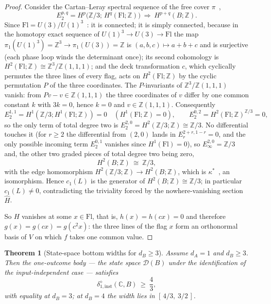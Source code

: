 \documentclass[11pt,a4paper]{article}
\newtheorem{theorem}{Theorem}[section]
\begin{document}
\begin{proof}
Consider the Cartan--Leray spectral sequence of the free cover
$\pi$~\cite{Brown1982},
\[
E_2^{p,q}=H^p\bigl(\mathbb Z/3;\,H^q(\mathrm{Fl};\mathbb Z)\bigr)
\ \Longrightarrow\ H^{p+q}(B;\mathbb Z).
\]
Since $\mathrm{Fl}=U(3)/U(1)^3$~\cite{Fulton1997}: it is connected; it is simply
connected, because in the homotopy exact sequence of
$U(1)^3\to U(3)\to\mathrm{Fl}$ the map
$\pi_1(U(1)^3)=\mathbb Z^3\to\pi_1(U(3))=\mathbb Z$ is
$(a,b,c)\mapsto a+b+c$ and is surjective (each phase loop winds the determinant
once); its second cohomology is
$H^2(\mathrm{Fl};\mathbb Z)\cong\mathbb Z^3/\mathbb Z(1,1,1)$; and the deck
transformation $c$, which cyclically permutes the three lines of every flag,
acts on $H^2(\mathrm{Fl};\mathbb Z)$ by the cyclic permutation $P$ of the three
coordinates. The $P$-invariants of $\mathbb Z^3/\mathbb Z(1,1,1)$ vanish: from
$Pv-v\in\mathbb Z(1,1,1)$ the three coordinates of $v$ differ by one common
constant $k$ with $3k=0$, hence $k=0$ and $v\in\mathbb Z(1,1,1)$. Consequently
\[
E_2^{1,1}=H^1(\mathbb Z/3;H^1(\mathrm{Fl};\mathbb Z))=0
\quad(H^1(\mathrm{Fl};\mathbb Z)=0),
\qquad
E_2^{0,2}=H^2(\mathrm{Fl};\mathbb Z)^{\mathbb Z/3}=0,
\]
so the only term of total degree two is
$E_2^{2,0}=H^2(\mathbb Z/3;\mathbb Z)\cong\mathbb Z/3$. No differential touches
it (for $r\ge2$ the differential from $(2,0)$ lands in $E_r^{2+r,1-r}=0$, and the
only possible incoming term $E_2^{0,1}$ vanishes since $H^1(\mathrm{Fl})=0$), so
$E_\infty^{2,0}=\mathbb Z/3$ and, the other two graded pieces of total degree
two being zero,
\[
H^2(B;\mathbb Z)\ \cong\ \mathbb Z/3,
\]
with the edge homomorphism $H^2(\mathbb Z/3;\mathbb Z)\to H^2(B;\mathbb Z)$,
which is $\kappa^*$~\cite{Brown1982}, an isomorphism. Hence $c_1(L)$ is the
generator of $H^2(B;\mathbb Z)\cong\mathbb Z/3$; in particular $c_1(L)\neq0$,
contradicting the triviality forced by the nowhere-vanishing section
$\widehat H$.

So $H$ vanishes at some $x\in\mathrm{Fl}$, that is, $h(x)=h(cx)=0$ and therefore
$g(x)=g(cx)=g(c^2x)$: the three lines of the flag $x$ form an orthonormal basis
of $V$ on which $f$ takes one common value.
\end{proof}

\begin{theorem}[State-space bottom widths for $d_B\ge3$]
\label{thm:state-nonflat}
Assume $d_A=1$ and $d_B\ge3$. Then the one-outcome body --- the state space
$\mathcal D(B)$ under the identification of the input-independent case ---
satisfies
\[
\delta_{1,\mathrm{inst}}^{\diamond}(\mathbb C,B)\ \ge\ \frac43,
\]
with equality at $d_B=3$; at $d_B=4$ the width lies in $[\,4/3,\ 3/2\,]$.
\end{theorem}
\end{document}
